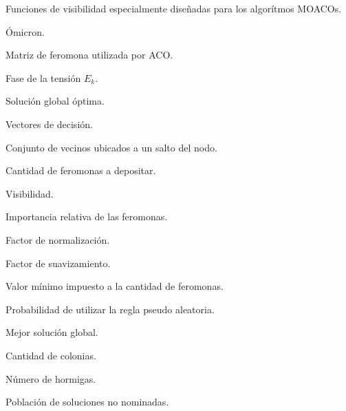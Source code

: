 \item[$\eta_1$,$\eta_2$,$\eta_3        $] Funciones de visibilidad especialmente dise\~nadas para los algor\'itmos MOACOs.%
\item[$\textit{O}        $] Ómicron.%
\item[$\tau        $] Matriz de feromona utilizada por ACO.%
\item[$\theta_k        $] Fase de la tensi\'on $E_k$.%
\item[$x^*        $] Soluci\'on global \'optima.%
\item[$u,v,x        $] Vectores de decisi\'on.%
\item[$J_i        $] Conjunto de vecinos ubicados a un salto del nodo.%
\item[$\Delta \tau        $] Cantidad de feromonas a depositar.%
\item[$\eta        $] Visibilidad.%
\item[$\alpha        $] Importancia relativa de las feromonas.%
\item[$Z        $] Factor de normalizaci\'on.%
\item[$f_s        $] Factor de suavizamiento.%
\item[$\tau_{min}        $] Valor m\'inimo impuesto a la cantidad de feromonas.%
\item[$q_o        $] Probabilidad de utilizar la regla pseudo aleatoria.%
\item[$gb        $] Mejor soluci\'on global.%
\item[$b        $] Cantidad de colonias.%
\item[$l        $] N\'umero de hormigas.%
\item[$P        $] Poblaci\'on de soluciones no nominadas.%
